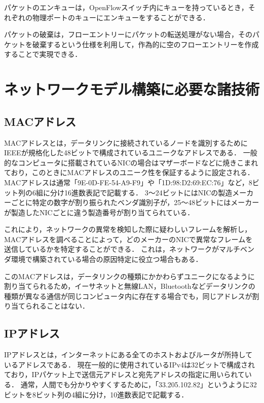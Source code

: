 パケットのエンキューは，OpenFlowスイッチ内にキューを持っているとき，それぞれの物理ポートのキューにエンキューをすることができる．

パケットの破棄は，フローエントリーにパケットの転送処理がない場合，そのパケットを破棄するという仕様を利用して，作為的に空のフローエントリーを作成することで実現できる．

\section{ネットワークモデル構築に必要な諸技術}

\subsection{MACアドレス}

MACアドレスとは，データリンクに接続されているノードを識別するためにIEEEが規格化した48ビットで構成されているユニークなアドレスである\cite{masteringtcpip}．
一般的なコンピュータに搭載されているNICの場合はマザーボードなどに焼きこまれており，このときにMACアドレスのユニーク性を保証するように設定される．
MACアドレスは通常「9E-0D-FE-54-A9-F9」や「1D:98:D2:69:EC:76」など，8ビット列の6組に分け16進数表記で記載する．
3～24ビットにはNICの製造メーカーごとに特定の数字が割り振られたベンダ識別子が，25～48ビットにはメーカーが製造したNICごとに違う製造番号が割り当てられている．

これにより，ネットワークの異常を検知した際に疑わしいフレームを解析し，MACアドレスを調べることによって，どのメーカーのNICで異常なフレームを送信しているかを特定することができる．
これは，ネットワークがマルチベンダ環境で構築されている場合の原因特定に役立つ場合もある．

このMACアドレスは，データリンクの種類にかかわらずユニークになるように割り当てられるため，イーサネットと無線LAN，Bluetoothなどデータリンクの種類が異なる通信が同じコンピュータ内に存在する場合でも，同じアドレスが割り当てられることはない．

\subsection{IPアドレス}

IPアドレスとは，インターネットにある全てのホストおよびルータが所持しているアドレスである\cite{tanenbaum}．
現在一般的に使用されているIPv4は32ビットで構成されており，IPパケット上で送信元アドレスと宛先アドレスの指定に用いられている．
通常，人間でも分かりやすくするために，「33.205.102.82」というように32ビットを8ビット列の4組に分け，10進数表記で記載する．

